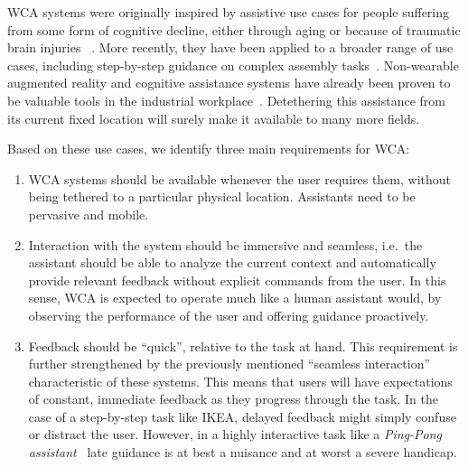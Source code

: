 \documentclass[10pt,letterpaper]{article}
\providecommand{\DIFaddtex}[1]{#1} %
\providecommand{\DIFdeltex}[1]{} %
\providecommand{\DIFaddbegin}{\protect\color{blue}} %
\providecommand{\DIFaddend}{\protect\color{black}} %
\providecommand{\DIFdelbegin}{\protect\color{red}} %
\providecommand{\DIFdelend}{\protect\color{black}} %
\providecommand{\DIFadd}[1]{\texorpdfstring{\DIFaddtex{#1}}{#1}} %
\providecommand{\DIFdel}[1]{\texorpdfstring{\DIFdeltex{#1}}{}} %
\newcommand{\DIFscaledelfig}{0.5}
\newlength{\DIFdelgraphicswidth} %
\newlength{\DIFdelgraphicsheight} %
\newcommand{\DIFaddincludegraphics}[2][]{{\color{blue}\fbox{\DIFOincludegraphics[#1]{#2}}}} %
\newcommand{\DIFdelincludegraphics}[2][]{%
\sbox{\DIFdelgraphicsbox}{\DIFOincludegraphics[#1]{#2}}%
\settoboxwidth{\DIFdelgraphicswidth}{\DIFdelgraphicsbox} %
\settoboxtotalheight{\DIFdelgraphicsheight}{\DIFdelgraphicsbox} %
\scalebox{\DIFscaledelfig}{%
\parbox[b]{\DIFdelgraphicswidth}{\usebox{\DIFdelgraphicsbox}\\[-\baselineskip] \rule{\DIFdelgraphicswidth}{0em}}\llap{\resizebox{\DIFdelgraphicswidth}{\DIFdelgraphicsheight}{%
\setlength{\unitlength}{\DIFdelgraphicswidth}%
\begin{picture}(1,1)%
\thicklines\linethickness{2pt} %
{\color[rgb]{1,0,0}\put(0,0){\framebox(1,1){}}}%
{\color[rgb]{1,0,0}\put(0,0){\line( 1,1){1}}}%
{\color[rgb]{1,0,0}\put(0,1){\line(1,-1){1}}}%
\end{picture}%
}\hspace*{3pt}}} %
} %
\DeclareRobustCommand{\DIFaddbegin}{\DIFOaddbegin \let\includegraphics\DIFaddincludegraphics} %
\DeclareRobustCommand{\DIFaddend}{\DIFOaddend \let\includegraphics\DIFOincludegraphics} %
\DeclareRobustCommand{\DIFdelbegin}{\DIFOdelbegin \let\includegraphics\DIFdelincludegraphics} %
\DeclareRobustCommand{\DIFdelend}{\DIFOaddend \let\includegraphics\DIFOincludegraphics} %
\begin{document}
WCA systems \DIFdelbegin \DIFdel{show great potential for two main use-cases.
One is providing quality of life improvements to the millions of people around the world affected by }\DIFdelend \DIFaddbegin \DIFadd{were originally inspired by assistive use cases for people suffering from }\DIFaddend some form of cognitive decline\DIFdelbegin \DIFdel{. 
WCA can, for instance, provide assistance to people recovering from }\DIFdelend \DIFaddbegin \DIFadd{, either through aging or because of }\DIFaddend traumatic brain injuries\DIFdelbegin \DIFdel{, smoothly guiding them through day-to-day interactions with the world which would otherwise be extremely challenging.
} \DIFdel{The second use-case is as a companion tool for specialists and as a means for guiding their training}\DIFdelend \DIFaddbegin \DIFadd{~}\cite{Ha:TowardsWearableCogAssist,satya2019augmenting}\DIFadd{.
More recently, they have been applied to a broader range of use cases, including step-by-step guidance on complex assembly tasks~}\cite{Chen:AnEmpiricalStudyOfLatency}\DIFaddend .
Non-wearable augmented reality and cognitive assistance systems have already been proven to be valuable tools in the industrial workplace~\cite{funk2015caworkplace,gorecky2011cognito}.
Detethering this assistance from its current fixed location will surely make it available to many more fields. 

Based on these use cases, we identify three main requirements for WCA:\@
\begin{enumerate}
    \item\label{item:pervasive} WCA systems should be available whenever the user requires them, without being tethered to a particular physical location. Assistants need to be pervasive and mobile.

    \item\label{item:interaction} Interaction with the system should be immersive and seamless, i.e.\ the assistant should be able to analyze the current context and automatically provide relevant feedback without explicit commands from the user.
    In this sense, WCA is expected to operate much like a human assistant would, by observing the performance of the user and offering guidance proactively.

    \item\label{item:lowlatency} Feedback should be ``quick'', relative to the task at hand. 
    This requirement is further strengthened by the previously mentioned ``seamless interaction'' characteristic of these systems.
    This means that users will have expectations of constant, immediate feedback as they progress through the task.
    In the case of a step-by-step task like IKEA, delayed feedback might simply confuse or distract the user.
    However, in a highly interactive task like a \emph{Ping-Pong assistant}~\cite{PingPongAssistant, Chen:EarlyImplementation} late guidance is at best a nuisance and at worst a severe handicap.
\end{enumerate}
\end{document}
